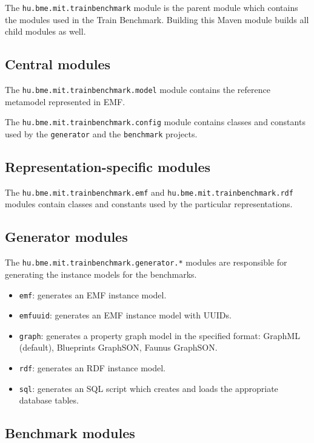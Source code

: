 The \texttt{hu.bme.mit.trainbenchmark} module is the parent module which contains the modules used in the Train Benchmark. Building this Maven module builds all child modules as well.

\subsection{Central modules}

The \texttt{hu.bme.mit.trainbenchmark.model} module contains the reference metamodel represented in EMF.

The \texttt{hu.bme.mit.trainbenchmark.config} module contains classes and constants used by the \texttt{generator} and the \texttt{benchmark} projects.

\subsection{Representation-specific modules}

The \texttt{hu.bme.mit.trainbenchmark.emf} and \texttt{hu.bme.mit.trainbenchmark.rdf} modules contain classes and constants used by the particular representations.

\subsection{Generator modules}

The \texttt{hu.bme.mit.trainbenchmark.generator.*} modules are responsible for generating the instance models for the benchmarks.

\begin{itemize}
  \item \texttt{emf}: generates an EMF instance model.
  \item \texttt{emfuuid}: generates an EMF instance model with UUIDs.
  \item \texttt{graph}: generates a property graph model in the specified format: GraphML (default), Blueprints GraphSON, Faunus GraphSON.
  \item \texttt{rdf}: generates an RDF instance model.
  \item \texttt{sql}: generates an SQL script which creates and loads the appropriate database tables.
\end{itemize}


\subsection{Benchmark modules}

